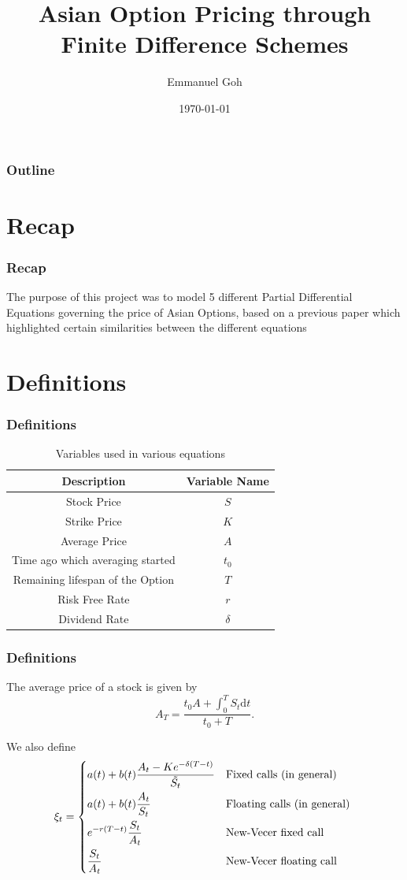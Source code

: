 \documentclass{beamer}
\title{Asian Option Pricing through Finite Difference Schemes}
\author{Emmanuel Goh}
\date{\today}
\begin{document}
  \begin{frame}
    \titlepage
  \end{frame}

  \begin{frame}
    \frametitle{Outline}
    \tableofcontents
  \end{frame}

  \section{Recap}
  \begin{frame}
    \frametitle{Recap}
    The purpose of this project was to model 5 different Partial Differential Equations governing the price of Asian Options, based on a previous paper which highlighted certain similarities between the different equations
  \end{frame}

  \section{Definitions}
  \begin{frame}
    \frametitle{Definitions}
    \begin{table}[h]
    \begin{tabular}{|c|c|}
      \hline
      \textbf{Description} & \textbf{Variable Name} \\ \hline
      Stock Price & \(S\) \\
      Strike Price & \(K\)\\
      Average Price & \(A\) \\
      Time ago which averaging started & \(t_0\) \\
      Remaining lifespan of the Option & \(T\) \\
      Risk Free Rate & \(r\) \\
      Dividend Rate & \(\delta\) \\
      \hline
    \end{tabular}
    \caption{Variables used in various equations}
    \label{table:name}
    \end{table}
  \end{frame}

  \begin{frame}
    \frametitle{Definitions}
    The average price of a stock is given by
    \begin{equation}
      A_T = \frac{t_0A + \int_0^T S_t \mathrm{d}t}{t_0 + T}.
    \end{equation}

    We also define
    \begin{equation}
      \xi_t =
      \begin{dcases*}
        a(t) + b(t) \frac{A_t - Ke^{-\delta(T-t)}}{\tilde{S_t}} & Fixed calls (in general) \\
        a(t) + b(t) \frac{A_t}{S_t} & Floating calls (in general) \\
        e^{-r(T-t)}\frac{S_t}{A_t} & New-Vecer fixed call \\
        \frac{S_t}{A_t} & New-Vecer floating call
      \end{dcases*}
    \end{equation}
  \end{frame}
\end{document}
